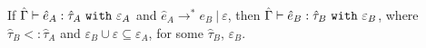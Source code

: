 \begin{theorem}
If $\hat \Gamma \vdash \hat e_A: \hat \tau_A~\mathtt{with}~ \varepsilon_A$ and $\hat e_A \longrightarrow^{*} e_B~|~\varepsilon$, then $\hat \Gamma \vdash \hat e_B: \hat \tau_B~\mathtt{with}~ \varepsilon_B$, where $\hat \tau_B <: \hat \tau_A$ and $\varepsilon_B \cup \varepsilon \subseteq \varepsilon_A$, for some $\hat \tau_B$, $\varepsilon_B$.
\end{theorem}









